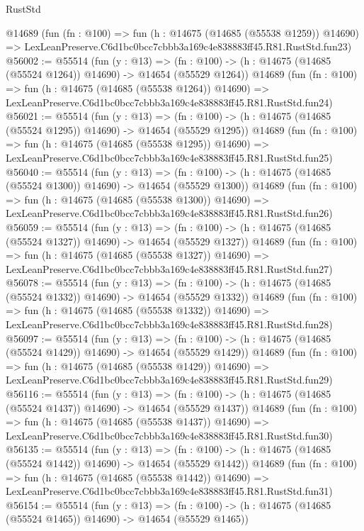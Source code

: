 \begin{lexlean}{RustStd}
\begin{coremodule}
    @14689
    (fun (fn : @100) =>
    fun (h : @14675 (@14685 (@55538 @1259)) @14690) =>
    LexLeanPreserve.C6d1bc0bcc7cbbb3a169c4e838883ff45.R81.RustStd.fun23)
@56002 := @55514
    (fun (y : @13) =>
    (fn : @100) -> (h : @14675 (@14685 (@55524 @1264)) @14690) -> @14654 (@55529 @1264))
    @14689
    (fun (fn : @100) =>
    fun (h : @14675 (@14685 (@55538 @1264)) @14690) =>
    LexLeanPreserve.C6d1bc0bcc7cbbb3a169c4e838883ff45.R81.RustStd.fun24)
@56021 := @55514
    (fun (y : @13) =>
    (fn : @100) -> (h : @14675 (@14685 (@55524 @1295)) @14690) -> @14654 (@55529 @1295))
    @14689
    (fun (fn : @100) =>
    fun (h : @14675 (@14685 (@55538 @1295)) @14690) =>
    LexLeanPreserve.C6d1bc0bcc7cbbb3a169c4e838883ff45.R81.RustStd.fun25)
@56040 := @55514
    (fun (y : @13) =>
    (fn : @100) -> (h : @14675 (@14685 (@55524 @1300)) @14690) -> @14654 (@55529 @1300))
    @14689
    (fun (fn : @100) =>
    fun (h : @14675 (@14685 (@55538 @1300)) @14690) =>
    LexLeanPreserve.C6d1bc0bcc7cbbb3a169c4e838883ff45.R81.RustStd.fun26)
@56059 := @55514
    (fun (y : @13) =>
    (fn : @100) -> (h : @14675 (@14685 (@55524 @1327)) @14690) -> @14654 (@55529 @1327))
    @14689
    (fun (fn : @100) =>
    fun (h : @14675 (@14685 (@55538 @1327)) @14690) =>
    LexLeanPreserve.C6d1bc0bcc7cbbb3a169c4e838883ff45.R81.RustStd.fun27)
@56078 := @55514
    (fun (y : @13) =>
    (fn : @100) -> (h : @14675 (@14685 (@55524 @1332)) @14690) -> @14654 (@55529 @1332))
    @14689
    (fun (fn : @100) =>
    fun (h : @14675 (@14685 (@55538 @1332)) @14690) =>
    LexLeanPreserve.C6d1bc0bcc7cbbb3a169c4e838883ff45.R81.RustStd.fun28)
@56097 := @55514
    (fun (y : @13) =>
    (fn : @100) -> (h : @14675 (@14685 (@55524 @1429)) @14690) -> @14654 (@55529 @1429))
    @14689
    (fun (fn : @100) =>
    fun (h : @14675 (@14685 (@55538 @1429)) @14690) =>
    LexLeanPreserve.C6d1bc0bcc7cbbb3a169c4e838883ff45.R81.RustStd.fun29)
@56116 := @55514
    (fun (y : @13) =>
    (fn : @100) -> (h : @14675 (@14685 (@55524 @1437)) @14690) -> @14654 (@55529 @1437))
    @14689
    (fun (fn : @100) =>
    fun (h : @14675 (@14685 (@55538 @1437)) @14690) =>
    LexLeanPreserve.C6d1bc0bcc7cbbb3a169c4e838883ff45.R81.RustStd.fun30)
@56135 := @55514
    (fun (y : @13) =>
    (fn : @100) -> (h : @14675 (@14685 (@55524 @1442)) @14690) -> @14654 (@55529 @1442))
    @14689
    (fun (fn : @100) =>
    fun (h : @14675 (@14685 (@55538 @1442)) @14690) =>
    LexLeanPreserve.C6d1bc0bcc7cbbb3a169c4e838883ff45.R81.RustStd.fun31)
@56154 := @55514
    (fun (y : @13) =>
    (fn : @100) -> (h : @14675 (@14685 (@55524 @1465)) @14690) -> @14654 (@55529 @1465))

\end{coremodule}
\end{lexlean}
